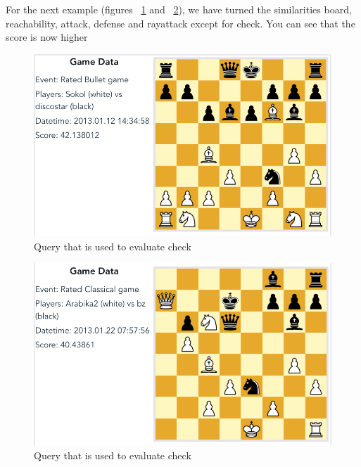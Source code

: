 \documentclass[11pt]{article}
\begin{document}
    For the next example (figures ~\ref{fig:BlackCheck1-BoReAtDe} and ~\ref{fig:BlackCheck2-BoReAtDe}), we have turned the similarities board, reachability, attack, defense and rayattack except for check. You can see that the score is now higher

    \begin{figure}[H]
        \centering
        \includegraphics[width=14cm]{images/BlackCheck1-BoReAtDe}
        \caption{Query that is used to evaluate check}
        \label{fig:BlackCheck1-BoReAtDe}
    \end{figure}

    \begin{figure}[H]
        \centering
        \includegraphics[width=14cm]{images/BlackCheck2-BoReAtDe}
        \caption{Query that is used to evaluate check}
        \label{fig:BlackCheck2-BoReAtDe}
    \end{figure}
\end{document}

